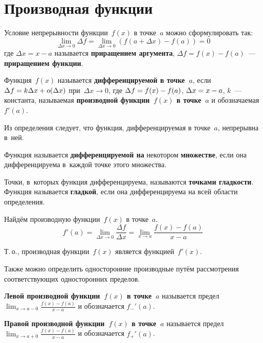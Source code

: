 \section{Производная функции}
Условие непрерывности функции~$f(x)$ в точке~$a$ можно сформулировать так:
\begin{equation*}
\lim_{\Delta x \to 0} \Delta f = \lim_{\Delta x \to 0} (f(a + \Delta x) - f(a)) = 0
\end{equation*}
где $\Delta x = x - a$ называется \textbf{приращением аргумента}, $\Delta f = f(x) - f(a)$~--- \textbf{приращением функции}.

 Функция~$f(x)$ называется \textbf{дифференцируемой в точке~$a$}, если
$\Delta f \opbr= k \Delta x + o(\Delta x)$ при~$\Delta x \to 0$, где
$\Delta f \opbr= f(x) - f(a)$,
$\Delta x \opbr= x - a$,
$k$~--- константа, называемая \textbf{производной функции~$f(x)$ в точке~$a$} и обозначаемая $f'(a)$.

Из определения следует, что функция, дифференцируемая в точке~$a$, непрерывна в~ней.

Функция называется \textbf{дифференцируемой на} некотором \textbf{множестве}, если она дифференцируема в~каждой точке этого множества.

 Точки, в~которых функция дифференцируема, называются \textbf{точками гладкости}.
Функция называется \textbf{гладкой}, если она дифференцируема на всей области определения.

Найдём производную функции~$f(x)$ в точке~$a$.
\begin{equation*}
f'(a) = \lim_{\Delta x \to 0} \frac{\Delta f}{\Delta x} = \lim_{x \to a} \frac{f(x) - f(a)}{x - a}
\end{equation*}

Т.\,о., производная функции~$f(x)$ является функцией~$f'(x)$.

Также можно определить односторонние производные путём рассмотрения соответствующих односторонних пределов.

\textbf{Левой производной функции~$f(x)$ в точке~$a$} называется предел~$\displaystyle \lim_{x \to a-0} \frac{f(x) - f(a)}{x - a}$ и обозначается $f_-'(a)$.

\textbf{Правой производной функции~$f(x)$ в точке~$a$} называется предел~$\displaystyle \lim_{x \to a+0} \frac{f(x) - f(a)}{x - a}$ и обозначается $f_+'(a)$.


